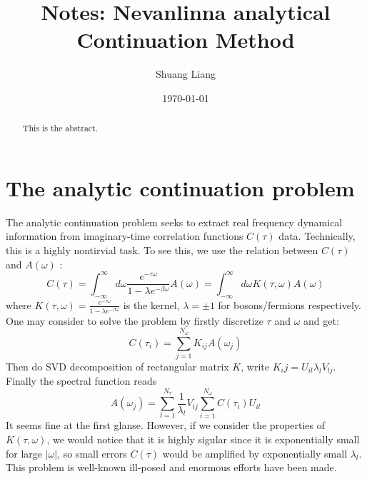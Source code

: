 \documentclass[
	preprint,%
	aps,
	prb,
	showpacs,	
	amsmath, amssymb]{revtex4-2}
\begin{document}
\title{Notes: Nevanlinna analytical Continuation Method}
\author{Shuang Liang}



\date{\today}
\begin{abstract}
	This is the abstract.
\end{abstract}


\maketitle
\tableofcontents

\newpage
\section{The analytic continuation problem}
\label{sec:the-analytic-continuation-problem}

The analytic continuation problem seeks   
to extract real frequency dynamical information from
imaginary-time correlation functions $C(\tau)$ data.
Technically, this is a highly nontirvial task\cite{jarrell1996bayesian}. To 
see this, we use the relation between $C(\tau)$ and $A(\omega)$
\cite{jarrell1996bayesian,XiaoLRT}:
\begin{equation}\label{eq:gt-Aw}
	C(\tau) = \int_{-\infty}^{\infty} d\omega
		\frac{e^{-\tau \omega }}{1 - \lambda e^{-\beta \omega}}
		A(\omega)
		= \int_{-\infty}^{\infty} d\omega
		K(\tau, \omega) A(\omega)
\end{equation}
where $K(\tau, \omega) = \frac{e^{-\tau \omega }}{1 - \lambda e^{-\beta \omega}}$
is the kernel, $\lambda =\pm 1$ for bosons/fermions respectively. One may consider to solve the problem by firstly 
discretize $\tau$ and $\omega$ and get:
\begin{equation}
	C(\tau_i) = \sum_{j=1}^{N_\omega} K_{ij} A(\omega_j)
\end{equation}
Then do SVD decomposition of rectangular matrix $K$, write
$K_ij = U_{il} \lambda_l V_{lj}$. Finally the spectral function 
reads
\begin{equation}
	A(\omega_j) = \sum_{l=1}^{N_\tau} \frac{1}{\lambda_l} V_{ij}
		\sum_{i=1}^{N_\omega} C(\tau_i) U_{il}
\end{equation}
It seems fine at the first glanse. However, if we consider 
the properties of $K(\tau, \omega)$, we would notice that it 
is highly sigular since it is exponentially small for large 
$|\omega|$, so small errors $C(\tau)$ would be amplified by
exponentially small $\lambda_l$. This problem is well-known
ill-posed\cite{acton1997numerical, peschel1999density} and 
enormous efforts have been made\cite{}.
\end{document}
